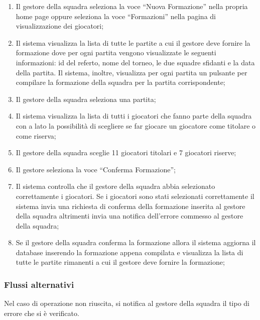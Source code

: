 \begin{enumerate}
	
	\item
	Il gestore della squadra seleziona la voce ``Nuova Formazione'' nella propria home page oppure seleziona la voce ``Formazioni'' nella pagina di visualizzazione dei giocatori;
	
	\item
	Il sistema visualizza la lista di tutte le partite a cui il gestore deve fornire la formazione dove per ogni partita vengono visualizzate le seguenti informazioni: id del referto, nome del torneo, le due squadre sfidanti e la data della partita. Il sistema, inoltre, visualizza per ogni partita un pulsante per compilare la formazione della squadra per la partita corrispondente;
	
	\item
	Il gestore della squadra seleziona una partita;
	
	\item
	Il sistema visualizza la lista di tutti i giocatori che fanno parte della squadra con a lato la possibilità di scegliere se far giocare un giocatore come titolare o come riserva;
	
	\item
	Il gestore della squadra sceglie 11 giocatori titolari e 7 giocatori riserve;
	
	\item
	Il gestore seleziona la voce ``Conferma Formazione'';
	
	\item
	Il sistema controlla che il gestore della squadra abbia selezionato correttamente i giocatori. Se i giocatori sono stati selezionati correttamente il sistema invia una richiesta di conferma della formazione inserita al gestore della squadra altrimenti invia una notifica dell'errore commesso al gestore della squadra;
	
	\item
	Se il gestore della squadra conferma la formazione allora il sistema aggiorna il database inserendo la formazione appena compilata e visualizza la lista di tutte le partite rimanenti a cui il gestore deve fornire la formazione;
	
\end{enumerate}

\subsubsection*{Flussi alternativi}
Nel caso di operazione non riuscita, si notifica al gestore della squadra il tipo di errore che si è verificato.


